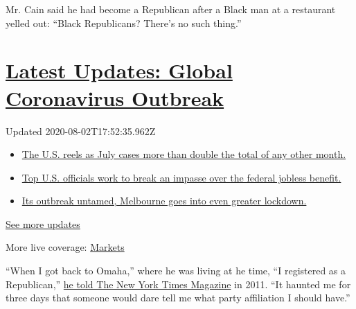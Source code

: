 Mr. Cain said he had become a Republican after a Black man at a
restaurant yelled out: ``Black Republicans? There's no such thing.''

\hypertarget{latest-updates-global-coronavirus-outbreak}{%
\section{\texorpdfstring{\href{https://www.nytimes3xbfgragh.onion/2020/08/01/world/coronavirus-covid-19.html?action=click\&pgtype=Article\&state=default\&region=MAIN_CONTENT_1\&context=storylines_live_updates}{Latest
Updates: Global Coronavirus
Outbreak}}{Latest Updates: Global Coronavirus Outbreak}}\label{latest-updates-global-coronavirus-outbreak}}

Updated 2020-08-02T17:52:35.962Z

\begin{itemize}
\tightlist
\item
  \href{https://www.nytimes3xbfgragh.onion/2020/08/01/world/coronavirus-covid-19.html?action=click\&pgtype=Article\&state=default\&region=MAIN_CONTENT_1\&context=storylines_live_updates\#link-34047410}{The
  U.S. reels as July cases more than double the total of any other
  month.}
\item
  \href{https://www.nytimes3xbfgragh.onion/2020/08/01/world/coronavirus-covid-19.html?action=click\&pgtype=Article\&state=default\&region=MAIN_CONTENT_1\&context=storylines_live_updates\#link-780ec966}{Top
  U.S. officials work to break an impasse over the federal jobless
  benefit.}
\item
  \href{https://www.nytimes3xbfgragh.onion/2020/08/01/world/coronavirus-covid-19.html?action=click\&pgtype=Article\&state=default\&region=MAIN_CONTENT_1\&context=storylines_live_updates\#link-2bc8948}{Its
  outbreak untamed, Melbourne goes into even greater lockdown.}
\end{itemize}

\href{https://www.nytimes3xbfgragh.onion/2020/08/01/world/coronavirus-covid-19.html?action=click\&pgtype=Article\&state=default\&region=MAIN_CONTENT_1\&context=storylines_live_updates}{See
more updates}

More live coverage:
\href{https://www.nytimes3xbfgragh.onion/live/2020/07/31/business/stock-market-today-coronavirus?action=click\&pgtype=Article\&state=default\&region=MAIN_CONTENT_1\&context=storylines_live_updates}{Markets}

``When I got back to Omaha,'' where he was living at he time, ``I
registered as a Republican,''
\href{https://www.nytimes3xbfgragh.onion/2011/07/03/magazine/herman-cain-talks-about-herman-cain.html}{he
told The New York Times Magazine} in 2011. ``It haunted me for three
days that someone would dare tell me what party affiliation I should
have.''

